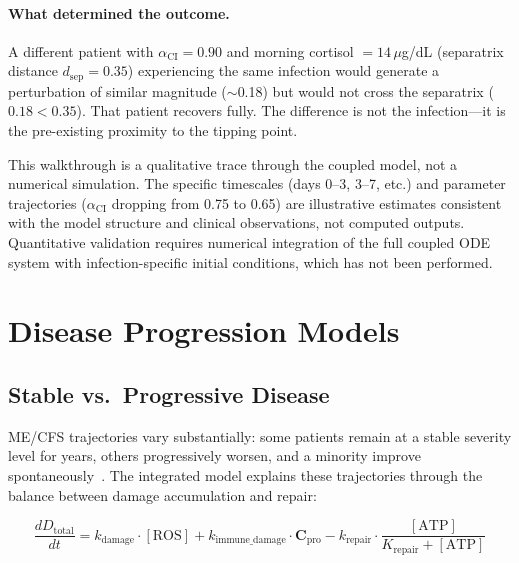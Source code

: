 \paragraph{What determined the outcome.}
A different patient with $\alpha_{\text{CI}} = 0.90$ and morning cortisol $= 14$\,$\mu$g/dL (separatrix distance $d_{\text{sep}} = 0.35$) experiencing the same infection would generate a perturbation of similar magnitude ($\sim$0.18) but would not cross the separatrix ($0.18 < 0.35$). That patient recovers fully. The difference is not the infection---it is the pre-existing proximity to the tipping point.

\begin{limitation}
This walkthrough is a qualitative trace through the coupled model, not a numerical simulation. The specific timescales (days 0--3, 3--7, etc.) and parameter trajectories ($\alpha_{\text{CI}}$ dropping from 0.75 to 0.65) are illustrative estimates consistent with the model structure and clinical observations, not computed outputs. Quantitative validation requires numerical integration of the full coupled ODE system with infection-specific initial conditions, which has not been performed.
\end{limitation}

\section{Disease Progression Models}
\label{sec:disease-progression-models}

\subsection{Stable vs.\ Progressive Disease}
\label{sec:stable-progressive}

ME/CFS trajectories vary substantially: some patients remain at a stable severity level for years, others progressively worsen, and a minority improve spontaneously~\cite{Brurberg2014}. The integrated model explains these trajectories through the balance between damage accumulation and repair:

\begin{equation}
\label{eq:damage-accumulation}
\frac{dD_{\text{total}}}{dt} = k_{\text{damage}} \cdot [\text{ROS}] + k_{\text{immune\_damage}} \cdot \boldsymbol{C}_{\text{pro}} - k_{\text{repair}} \cdot \frac{[\text{ATP}]}{K_{\text{repair}} + [\text{ATP}]}
\end{equation}


